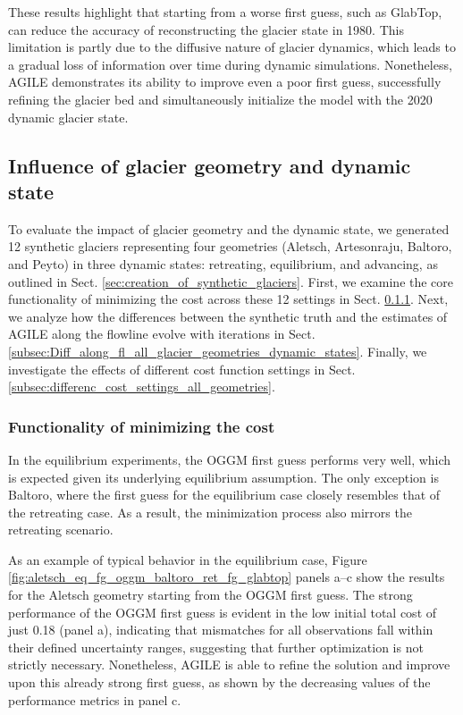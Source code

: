 \documentclass[journal abbreviation, manuscript]{copernicus}
\begin{document}
These results highlight that starting from a worse first guess, such as GlabTop, can reduce the accuracy of reconstructing the glacier state in 1980. This limitation is partly due to the diffusive nature of glacier dynamics, which leads to a gradual loss of information over time during dynamic simulations. Nonetheless, AGILE demonstrates its ability to improve even a poor first guess, successfully refining the glacier bed and simultaneously initialize the model with the 2020 dynamic glacier state.


\subsection{Influence of glacier geometry and dynamic state}
\label{sec:influence_geometry_dynamic_state}

To evaluate the impact of glacier geometry and the dynamic state, we generated 12 synthetic glaciers representing four geometries (Aletsch, Artesonraju, Baltoro, and Peyto) in three dynamic states: retreating, equilibrium, and advancing, as outlined in Sect. \ref{sec:creation_of_synthetic_glaciers}. First, we examine the core functionality of minimizing the cost across these 12 settings in Sect. \ref{subsec:principle_functionality_different_geometries_and_state}. Next, we analyze how the differences between the synthetic truth and the estimates of AGILE along the flowline evolve with iterations in Sect. \ref{subsec:Diff_along_fl_all_glacier_geometries_dynamic_states}. Finally, we investigate the effects of different cost function settings in Sect. \ref{subsec:differenc_cost_settings_all_geometries}.

\subsubsection{Functionality of minimizing the cost}
\label{subsec:principle_functionality_different_geometries_and_state}

In the equilibrium experiments, the OGGM first guess performs very well, which is expected given its underlying equilibrium assumption. The only exception is Baltoro, where the first guess for the equilibrium case closely resembles that of the retreating case. As a result, the minimization process also mirrors the retreating scenario.

As an example of typical behavior in the equilibrium case, Figure \ref{fig:aletsch_eq_fg_oggm_baltoro_ret_fg_glabtop} panels a–c show the results for the Aletsch geometry starting from the OGGM first guess. The strong performance of the OGGM first guess is evident in the low initial total cost of just 0.18 (panel a), indicating that mismatches for all observations fall within their defined uncertainty ranges, suggesting that further optimization is not strictly necessary. Nonetheless, AGILE is able to refine the solution and improve upon this already strong first guess, as shown by the decreasing values of the performance metrics in panel c.
\end{document}
